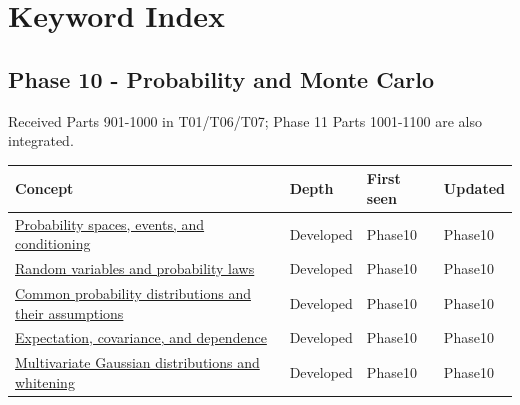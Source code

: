 \hypertarget{appendix-a6d556a4ef50}{}
\section{Keyword Index}\label{appendix-a6d556a4ef50-keyword-index}

\subsection{Phase 10 - Probability and Monte Carlo}\label{appendix-a6d556a4ef50-phase-10---probability-and-monte-carlo}

Received Parts 901-1000 in T01/T06/T07; Phase 11 Parts 1001-1100 are also integrated.

{\def\LTcaptype{none} %
\begin{longtable}[]{@{}
  >{\raggedright\arraybackslash}p{}
  >{\raggedright\arraybackslash}p{}
  >{\raggedright\arraybackslash}p{}
  >{\raggedright\arraybackslash}p{}@{}}
\toprule\noalign{}
\begin{minipage}[b]{\linewidth}\raggedright
Concept
\end{minipage} & \begin{minipage}[b]{\linewidth}\raggedright
Depth
\end{minipage} & \begin{minipage}[b]{\linewidth}\raggedright
First seen
\end{minipage} & \begin{minipage}[b]{\linewidth}\raggedright
Updated
\end{minipage} \\
\midrule\noalign{}
\endhead
\bottomrule\noalign{}
\endlastfoot
\hyperref[appendix-f1ef323f6ed7]{Probability spaces, events, and conditioning} & Developed & Phase10 & Phase10 \\
\hyperref[appendix-4d0203f7944f]{Random variables and probability laws} & Developed & Phase10 & Phase10 \\
\hyperref[appendix-a2360b435383]{Common probability distributions and their assumptions} & Developed & Phase10 & Phase10 \\
\hyperref[appendix-54c383df9992]{Expectation, covariance, and dependence} & Developed & Phase10 & Phase10 \\
\hyperref[appendix-12bbe185dbe5]{Multivariate Gaussian distributions and whitening} & Developed & Phase10 & Phase10 \\

\end{longtable}}
